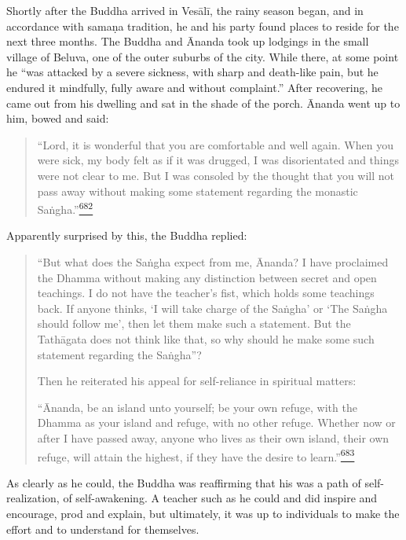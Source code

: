Shortly after the Buddha arrived in Vesālī, the rainy season began, and
in accordance with samaṇa tradition, he and his party found places to
reside for the next three months. The Buddha and Ānanda took up lodgings
in the small village of Beluva, one of the outer suburbs of the city.
While there, at some point he ``was attacked by a severe sickness, with
sharp and death-like pain, but he endured it mindfully, fully aware and
without complaint.'' After recovering, he came out from his dwelling and
sat in the shade of the porch. Ānanda went up to him, bowed and said:

\begin{quote}
``Lord, it is wonderful that you are comfortable and well again. When
you were sick, my body felt as if it was drugged, I was disorientated
and things were not clear to me. But I was consoled by the thought that
you will not pass away without making some statement regarding the
monastic
Saṅgha.''\label{footprints_split_017.html_fnref682}\hyperref[footprints_split_025.htmlux5cux23fn682]{\textsuperscript{682}}
\end{quote}

Apparently surprised by this, the Buddha replied:

\begin{quote}
``But what does the Saṅgha expect from me, Ānanda? I have proclaimed the
Dhamma without making any distinction between secret and open teachings.
I do not have the teacher's fist, which holds some teachings back. If
anyone thinks, `I will take charge of the Saṅgha' or `The Saṅgha should
follow me', then let them make such a statement. But the Tathāgata does
not think like that, so why should he make some such statement regarding
the Saṅgha''?

Then he reiterated his appeal for self-reliance in spiritual matters:

``Ānanda, be an island unto yourself; be your own refuge, with the
Dhamma as your island and refuge, with no other refuge. Whether now or
after I have passed away, anyone who lives as their own island, their
own refuge, will attain the highest, if they have the desire to
learn.''\label{footprints_split_017.html_fnref683}\hyperref[footprints_split_025.htmlux5cux23fn683]{\textsuperscript{683}}
\end{quote}

As clearly as he could, the Buddha was reaffirming that his was a path
of self-realization, of self-awakening. A teacher such as he could and
did inspire and encourage, prod and explain, but ultimately, it was up
to individuals to make the effort and to understand for themselves.

